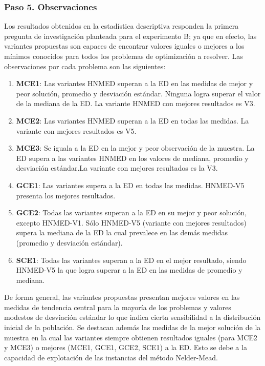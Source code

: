 \subsubsection{Paso 5. Observaciones}
Los resultados obtenidos en la estadística descriptiva responden la primera pregunta de investigación planteada para el experimento B; ya que en efecto, las variantes propuestas son capaces de encontrar valores iguales o mejores a los mínimos conocidos para todos los problemas de optimización a resolver. Las observaciones por cada problema son las siguientes:
\begin{enumerate}
	\item \textbf{MCE1}: Las variantes HNMED superan a la ED en las medidas de mejor y peor solución, promedio y desviación estándar. Ninguna logra superar el valor de la mediana de la ED. La variante HNMED con mejores resultados es V3.
	\item \textbf{MCE2}: Las variantes HNMED superan a la ED en todas las medidas. La variante con mejores resultados es V5.
	\item \textbf{MCE3}: Se iguala a la ED en la mejor y peor observación de la muestra. La ED supera a las variantes HNMED en los valores de mediana, promedio y desviación estándar.La variante con mejores resultados es la V3.
	\item \textbf{GCE1}: Las variantes supera a la ED en todas las medidas. HNMED-V5 presenta los mejores resultados.
	\item \textbf{GCE2}: Todas las variantes superan a la ED en su mejor y peor solución, excepto HNMED-V1. Sólo HNMED-V5 (variante con mejores resultados) supera la mediana de la ED la cual prevalece en las demás medidas (promedio y desviación estándar).
	\item \textbf{SCE1}: Todas las variantes superan a la ED en el mejor resultado, siendo HNMED-V5 la que logra superar a la ED en las medidas de promedio y mediana. 
\end{enumerate}
 De forma general, las variantes propuestas presentan mejores valores en las medidas de tendencia central para la mayoría de los problemas y valores modestos de desviación estándar lo que indica cierta sensibilidad a la distribución inicial de la población. Se destacan además las medidas de la mejor solución de la muestra en la cual las variantes siempre obtienen resultados iguales (para MCE2 y MCE3) o mejores (MCE1, GCE1, GCE2, SCE1) a la ED. Esto se debe a la capacidad de explotación de las instancias del método Nelder-Mead.

